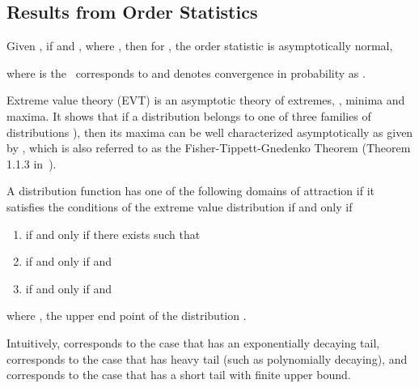 \subsection{Results from Order Statistics}
\label{sec:central_order_stats}
\begin{thm}
\label{thm:central_order_stats}
Given , if  and , where , then
for , the  order statistic is asymptotically normal,

where  is the \pdfunc\ corresponds to  and  denotes convergence in probability as .
\end{thm}
{Extreme value theory} (EVT) is an asymptotic theory of extremes, \ie, minima and maxima. It shows that if a distribution belongs to one of three families of distributions ), then its maxima can be well characterized asymptotically as given by , which is also referred to as the
Fisher-Tippett-Gnedenko Theorem (Theorem 1.1.3 in~\cite{haan_extreme_2006}).
\begin{thm}
    \label{thm:domain_of_attractions}
    A distribution function  has one of the following domains of attraction if it satisfies the conditions of the extreme value
    distribution  if and only if
    \begin{enumerate}
        \item  if and only if there exists  such that
            
        \item  if and only if  and
            
        \item  if and only if  and
            
    \end{enumerate}
    where , the upper end point of the distribution .
\end{thm}

Intuitively, 
 corresponds to the case that  has an exponentially decaying tail, 
 corresponds to the case that  has heavy tail (such as 
polynomially decaying), 
and 
 corresponds to the case that  has a short tail with finite
upper bound.

